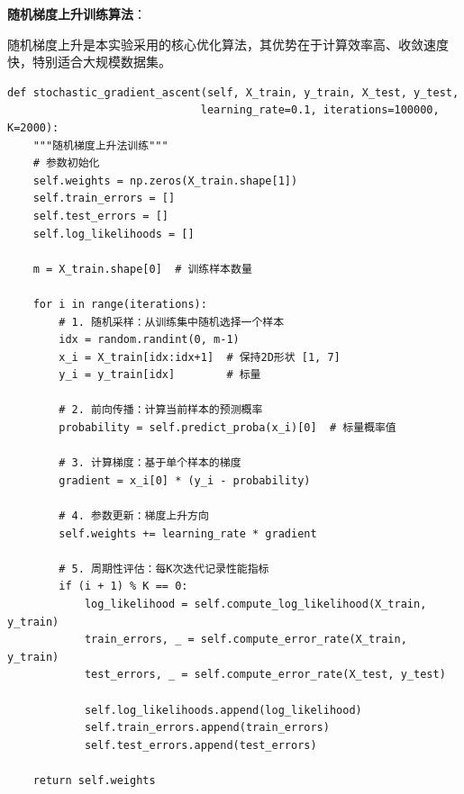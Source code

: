 \documentclass[a4paper]{article}
\begin{document}
\textbf{随机梯度上升训练算法}：

随机梯度上升是本实验采用的核心优化算法，其优势在于计算效率高、收敛速度快，特别适合大规模数据集。

\begin{lstlisting}[caption=随机梯度上升训练核心算法]
def stochastic_gradient_ascent(self, X_train, y_train, X_test, y_test,
                              learning_rate=0.1, iterations=100000, K=2000):
    """随机梯度上升法训练"""
    # 参数初始化
    self.weights = np.zeros(X_train.shape[1])
    self.train_errors = []
    self.test_errors = []
    self.log_likelihoods = []
    
    m = X_train.shape[0]  # 训练样本数量
    
    for i in range(iterations):
        # 1. 随机采样：从训练集中随机选择一个样本
        idx = random.randint(0, m-1)
        x_i = X_train[idx:idx+1]  # 保持2D形状 [1, 7]
        y_i = y_train[idx]        # 标量
        
        # 2. 前向传播：计算当前样本的预测概率
        probability = self.predict_proba(x_i)[0]  # 标量概率值
        
        # 3. 计算梯度：基于单个样本的梯度
        gradient = x_i[0] * (y_i - probability)
        
        # 4. 参数更新：梯度上升方向
        self.weights += learning_rate * gradient
        
        # 5. 周期性评估：每K次迭代记录性能指标
        if (i + 1) % K == 0:
            log_likelihood = self.compute_log_likelihood(X_train, y_train)
            train_errors, _ = self.compute_error_rate(X_train, y_train)
            test_errors, _ = self.compute_error_rate(X_test, y_test)
            
            self.log_likelihoods.append(log_likelihood)
            self.train_errors.append(train_errors)
            self.test_errors.append(test_errors)
    
    return self.weights
\end{lstlisting}
\end{document}
